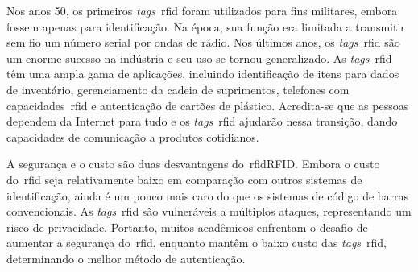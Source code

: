 Nos anos 50, os primeiros \textit{tags}~\acrshort{rfid} foram utilizados para
fins militares, embora fossem apenas para identificação.
Na época, sua função era limitada a transmitir sem fio um número serial
por ondas de rádio.
Nos últimos anos, os \textit{tags}~\acrshort{rfid} são um enorme sucesso na
indústria e seu uso se tornou generalizado.
As \textit{tags}~\acrshort{rfid} têm uma ampla gama de aplicações, incluindo
identificação de itens para dados de inventário, gerenciamento da cadeia de
suprimentos, telefones com capacidades~\acrshort{rfid} e autenticação de cartões
de plástico.
Acredita-se que as pessoas dependem da Internet para tudo e os \textit{tags}~\acrshort{rfid}
ajudarão nessa transição, dando capacidades de comunicação a produtos
cotidianos\cite{idrus2013}.

A segurança e o custo são duas desvantagens do~\acrshort{rfid}RFID.
Embora o custo do~\acrshort{rfid} seja relativamente baixo em comparação com
outros sistemas de identificação, ainda é um pouco mais caro do que os sistemas
de código de barras convencionais.
As \textit{tags}~\acrshort{rfid} são vulneráveis a múltiplos ataques, representando
um risco de privacidade.
Portanto, muitos acadêmicos enfrentam o desafio de aumentar a segurança do~\acrshort{rfid},
enquanto mantêm o baixo custo das \textit{tags}~\acrshort{rfid}, determinando o
melhor método de autenticação\cite{jadhao2018}.